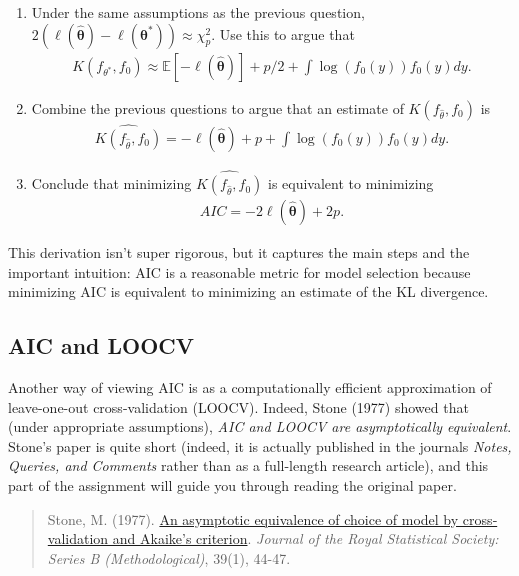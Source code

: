 \documentclass[11pt]{article}
\begin{document}
\begin{enumerate}
\item Under the same assumptions as the previous question, $2(\ell(\widehat{\bm{\theta}}) - \ell(\bm{\theta}^*)) \approx \chi^2_p$. Use this to argue that 
\begin{align}
K(f_{\theta^*}, f_0) \approx \mathbb{E}[- \ell(\widehat{\bm{\theta}})] + p/2 + \int \log(f_0(y)) f_0(y) dy.
\end{align}

\item Combine the previous questions to argue that an estimate of $K(f_{\widehat{\theta}}, f_0)$ is
\begin{align}
\widehat{K(f_{\widehat{\theta}}, f_0)} = -\ell(\widehat{\bm{\theta}}) + p + \int \log(f_0(y)) f_0(y) dy.
\end{align}

\item Conclude that minimizing $\widehat{K(f_{\widehat{\theta}}, f_0)}$ is equivalent to minimizing
\begin{align*}
AIC = -2\ell(\widehat{\bm{\theta}}) + 2p.
\end{align*}
\end{enumerate}

\noindent This derivation isn't super rigorous, but it captures the main steps and the important intuition: AIC is a reasonable metric for model selection because minimizing AIC is equivalent to minimizing an estimate of the KL divergence.

\subsection*{AIC and LOOCV}

Another way of viewing AIC is as a computationally efficient approximation of leave-one-out cross-validation (LOOCV). Indeed, Stone (1977) showed that (under appropriate assumptions), \textit{AIC and LOOCV are asymptotically equivalent}. Stone's paper is quite short (indeed, it is actually published in the journals \textit{Notes, Queries, and Comments} rather than as a full-length research article), and this part of the assignment will guide you through reading the original paper.\\

\begin{quote}
Stone, M. (1977). \href{https://www.jstor.org/stable/2984877}{An asymptotic equivalence of choice of model by cross‐validation and Akaike's criterion}. \textit{Journal of the Royal Statistical Society: Series B (Methodological)}, 39(1), 44-47.
\end{quote}
\end{document}
